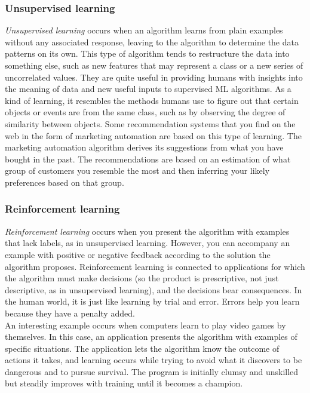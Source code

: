 \subsubsection{Unsupervised learning}
\emph{Unsupervised learning} occurs when an algorithm learns from plain examples without any associated response, leaving to the algorithm to determine the data patterns on its own. This type of algorithm tends to restructure the data into something else, such as new features that may represent a class or a new series of uncorrelated values. They are quite useful in providing humans with insights into the meaning of data and new useful inputs to supervised ML algorithms. As a kind of learning, it resembles the methods humans use to figure out that certain objects or events are from the same class, such as by observing the degree of similarity between objects. Some recommendation systems that you find on the web in the form of marketing automation are based on this type of learning. The marketing automation algorithm derives its suggestions from what you have bought in the past. The recommendations are based on an estimation of what group of customers you resemble the most and then inferring your likely preferences based on that group.

\subsubsection{Reinforcement learning}
\emph{Reinforcement learning}
occurs when you present the algorithm with examples that lack labels, as in unsupervised learning. However, you can accompany an example with positive or negative feedback according to the solution the algorithm proposes. Reinforcement learning is connected to applications for which the algorithm must make decisions (so the product is prescriptive, not just descriptive, as in unsupervised learning), and the decisions bear consequences. In the human world, it is just like learning by trial and error. Errors help you learn because they have a penalty added.\\
An interesting example occurs when computers learn to play video games by themselves. In this case, an application presents the algorithm with examples of specific situations. The application lets the algorithm know the outcome of actions it takes, and learning occurs while trying to avoid what it discovers to be dangerous and to pursue survival. The program is initially clumsy and unskilled but steadily improves with training until it becomes a champion.
